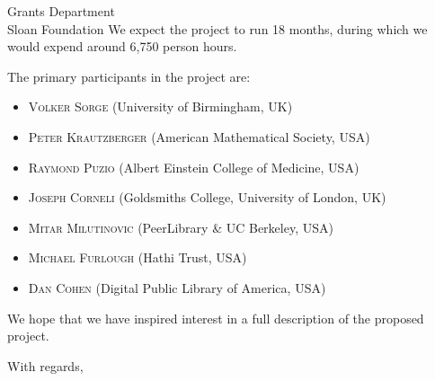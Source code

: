 \documentclass{letter}
\begin{document}
\begin{letter}{Grants Department \\ Sloan Foundation}
We expect the project to run 18 months, during which we would expend
around 6,750 person hours.

The primary participants in the project are:

\begin{itemize}[label={},itemsep=-5pt]
\item {\scshape Volker Sorge} (University of Birmingham, UK)\\
\item {\scshape Peter Krautzberger} (American Mathematical Society, USA)\\ 
\item {\scshape Raymond Puzio} (Albert Einstein College of Medicine, USA) \\
\item {\scshape Joseph Corneli} (Goldsmiths College, University of London, UK) \\
\item {\scshape Mitar Milutinovic} (PeerLibrary \& UC Berkeley, USA) \\
\item {\scshape Michael Furlough} (Hathi Trust, USA) \\
\item {\scshape Dan Cohen} (Digital Public Library of America, USA)
\end{itemize}

We hope that we have inspired interest in a full description of the
proposed project.

\closing{With regards,}
\end{letter}

\end{document}

